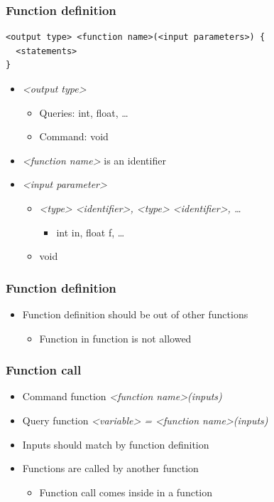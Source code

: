 \documentclass{../c-lecture}
\begin{document}
\begin{frame}[fragile]
  \frametitle{Function \textbf{definition}}
  \begin{verbatim}
<output type> <function name>(<input parameters>) {
  <statements>
}
  \end{verbatim}
  \begin{itemize}
    \item \textit{\color{VioletRed} <output type>}
    \begin{itemize}
      \item \textmd{\color{Orange} Queries}: int, float, \ldots
      \item \textmd{\color{LimeGreen} Command}: void
    \end{itemize}
    \item
      \textit{\color{LimeGreen} <function name>} is an identifier
    \item \textit{\color{Cyan} <input parameter>}
    \begin{itemize}
      \item
        \textit{<type> <identifier>, <type> <identifier>, \ldots}
      \begin{itemize}
        \item int in, float f, \ldots
      \end{itemize}
      \item void
    \end{itemize}
  \end{itemize}
\end{frame}

\begin{frame}
  \frametitle{Function \textbf{definition}}
  \begin{itemize}
    \item Function definition should be out of other functions
    \begin{itemize}
      \item Function in function is not allowed
    \end{itemize}
  \end{itemize}
\end{frame}

\begin{frame}
  \frametitle{Function call}
  \begin{itemize}
    \item Command function
    \textit{\color{LimeGreen} <function name>(inputs)}
    \item Query function
    \textit{\color{YellowOrange} <variable> = <function name>(inputs)}
    \item Inputs should match by function definition
    \item Functions are called by another function
    \begin{itemize}
      \item Function call comes inside in a function
    \end{itemize}
  \end{itemize}
\end{frame}
\end{document}
